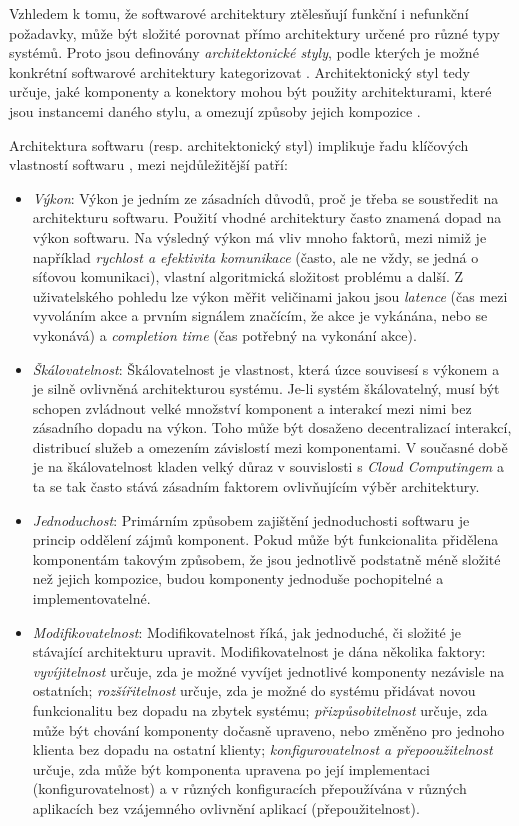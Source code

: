 Vzhledem k tomu, že softwarové architektury ztělesňují funkční i nefunkční požadavky, může být složité porovnat přímo architektury určené pro různé typy systémů. Proto jsou definovány \textit{architektonické styly}, podle kterých je možné konkrétní softwarové architektury kategorizovat \cite{Nitto99}. Architektonický styl tedy určuje, jaké komponenty a konektory mohou být použity architekturami, které jsou instancemi daného stylu, a omezují způsoby jejich kompozice \cite{Garlan95}.

Architektura softwaru (resp. architektonický styl) implikuje řadu klíčových vlastností softwaru \cite{Ghezzi03}, mezi nejdůležitější patří:
\begin{itemize}
  \item{\textit{Výkon}}: Výkon je jedním ze zásadních důvodů, proč je třeba se soustředit na architekturu softwaru. Použití vhodné architektury často znamená dopad na výkon softwaru. Na výsledný výkon má vliv mnoho faktorů, mezi nimiž je například \textit{rychlost a efektivita komunikace} (často, ale ne vždy, se jedná o síťovou komunikaci), vlastní algoritmická složitost problému a další. Z uživatelského pohledu lze výkon měřit veličinami jakou jsou \textit{latence} (čas mezi vyvoláním akce a prvním signálem značícím, že akce je vykánána, nebo se vykonává) a \textit{completion time} (čas potřebný na vykonání akce).
  \item{\textit{Škálovatelnost}}: Škálovatelnost je vlastnost, která úzce souvisesí s výkonem a je silně ovlivněná architekturou systému. Je-li systém škálovatelný, musí být schopen zvládnout velké množství komponent a interakcí mezi nimi bez zásadního dopadu na výkon. Toho může být dosaženo decentralizací interakcí, distribucí služeb a omezením závislostí mezi komponentami. V současné době je na škálovatelnost kladen velký důraz v souvislosti s \textit{Cloud Computingem} \cite{Mell11} a ta se tak často stává zásadním faktorem ovlivňujícím výběr architektury.
  \item{\textit{Jednoduchost}}: Primárním způsobem zajištění jednoduchosti softwaru je princip oddělení zájmů komponent. Pokud může být funkcionalita přidělena komponentám takovým způsobem, že jsou jednotlivě podstatně méně složité než jejich kompozice, budou komponenty jednoduše pochopitelné a implementovatelné.
  \item{\textit{Modifikovatelnost}}: Modifikovatelnost říká, jak jednoduché, či složité je stávající architekturu upravit. Modifikovatelnost je dána několika faktory: \textit{vyvíjitelnost} určuje, zda je možné vyvíjet jednotlivé komponenty nezávisle na ostatních; \textit{rozšířitelnost} určuje, zda je možné do systému přidávat novou funkcionalitu bez dopadu na zbytek systému; \textit{přizpůsobitelnost} určuje, zda může být chování komponenty dočasně upraveno, nebo změněno pro jednoho klienta bez dopadu na ostatní klienty; \textit{konfigurovatelnost a přepooužitelnost} určuje, zda může být komponenta upravena po její implementaci (konfigurovatelnost) a v různých konfiguracích přepoužívána v různých aplikacích bez vzájemného ovlivnění aplikací (přepoužitelnost).

\end{itemize}
